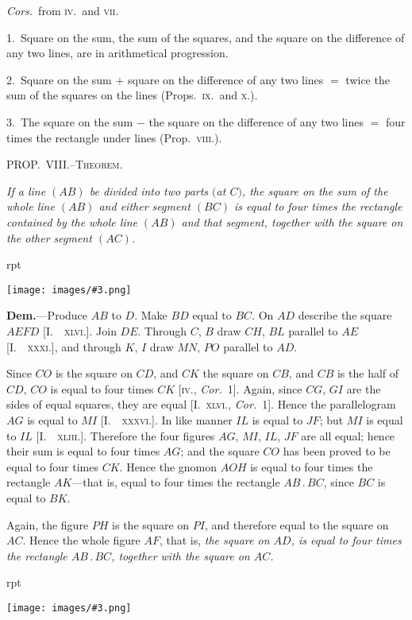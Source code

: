 \documentclass[oneside]{book}
\newcounter{wrapwidth}
\newcommand\mypropl[2]{
\bigskip\Needspace*{4\baselineskip}\begin{center}\textsc{#1}\end{center}
\hspace{\parindent}\emph{#2}\par\medskip
}
\newcommand\imgflow[3]{
\setcounter{wrapwidth}{#1}
\begin{wrapfigure}[#2]{r}{\value{wrapwidth}pt}
\begin{center}
\vspace{-0.3in}
\texttt{[image: images/\#3.png]}
\end{center}
\end{wrapfigure}
}
\begin{document}
\textit{Cors.}\ from \textsc{iv}.\ and \textsc{vii}.

1.~Square on the sum, the sum of the squares, and
the square on the difference of any two lines, are in
arithmetical progression.

2.~Square on the sum $+$ square on the difference of
any two lines $=$ twice the sum of the squares on the
lines (Props.~\textsc{ix}.\ and \textsc{x}.).

3.~The square on the sum $-$ the square on the difference
of any two lines $=$ four times the rectangle under
lines (Prop.~\textsc{viii}.).


\mypropl{PROP\@.~VIII\@.--Theorem.}{If a line $(AB)$ be divided into two parts $($at $C)$, the
square on the sum of the whole line $(AB)$ and either segment
$(BC)$ is equal to four times the rectangle contained
by the whole line $(AB)$ and that segment, together with
the square on the other segment $(AC)$.}

\imgflow{110}{8}{f089}

\textbf{Dem.}---Produce $AB$ to $D$. Make $BD$ equal to $BC$.
On $AD$ describe the square $AEFD$
[I.~\textsc{~xlvi}.]. Join $DE$. Through
$C$, $B$ draw $CH$, $BL$ parallel to $AE$
[I.~\textsc{~xxxi}.], and through $K$, $I$ draw
$MN$, $PO$ parallel to $AD$.

Since $CO$ is the square on $CD$,
and $CK$ the square on $CB$, and
$CB$ is the half of $CD$, $CO$ is equal
to four times $CK$ [\textsc{iv.,} \textit{Cor.}~1].
Again, since $CG$, $GI$ are the sides of equal squares,
they are equal [I.~\textsc{xlvi.}, \textit{Cor.}~1]. Hence the parallelogram
$AG$ is equal to $MI$ [I.~\textsc{~xxxvi}.]. In like manner
$IL$ is equal to $JF$; but $MI$ is equal to $IL$ [I.~\textsc{~xliii}.].
Therefore the four figures $AG$, $MI$, $IL$, $JF$ are all
equal; hence their sum is equal to four times $AG$; and
the square $CO$ has been proved to be equal to four times
$CK$. Hence the gnomon $AOH$ is equal to four times
the rectangle $AK$---that is, equal to four times the
rectangle $AB\,.\,BC$, since $BC$ is equal to $BK$.

Again, the figure $PH$ is the square on $PI$, and
therefore equal to the square on $AC$. Hence the
whole figure $AF$, that is, \textit{the square on $AD$, is equal
to four times the rectangle $AB\,.\,BC$, together with the
square on $AC$.}\par\medskip

\imgflow{105}{9}{f090}
\end{document}
